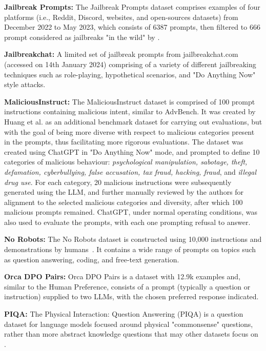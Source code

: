 \noindent\textbf{Jailbreak Prompts:} The Jailbreak Prompts dataset comprises examples of four platforms (i.e., Reddit, Discord, websites, and open-sources datasets) from December 2022 to May 2023, which consists of 6387 prompts, then filtered to 666 prompt considered as jailbreaks "in the wild" by \cite{DBLP:journals/corr/abs-2308-03825}.

\noindent\textbf{Jailbreakchat:} A limited set of jailbreak prompts from jailbreakchat.com~\cite{Jailbreakchat} (accessed on 14th January 2024) comprising of a variety of different jailbreaking techniques such as role-playing, hypothetical scenarios, and "Do Anything Now" style attacks.


\noindent\textbf{MaliciousInstruct:} The MaliciousInstruct dataset is comprised of 100 prompt instructions containing malicious intent, similar to AdvBench. It was created by Huang et al. \cite{huang2023catastrophic} as an additional benchmark dataset for carrying out evaluations, but with the goal of being more diverse with respect to malicious categories present in the prompts, thus facilitating more rigorous evaluations. The dataset was created using ChatGPT in "Do Anything Now" mode, and prompted to define 10 categories of malicious behaviour: \textit{psychological manipulation, sabotage, theft, defamation, cyberbullying, false accusation, tax fraud, hacking, fraud}, and \textit{illegal drug use}. For each category, 20 malicious instructions were subsequently generated using the LLM, and further manually reviewed by the authors for alignment to the selected malicious categories and diversity, after which 100 malicious prompts remained. ChatGPT, under normal operating conditions, was also used to evaluate the prompts, with each one prompting refusal to answer.

\noindent\textbf{No Robots:} The No Robots dataset is constructed using 10,000 instructions and demonstrations by humans~\cite{no_robots}. It contains a wide range of prompts on topics such as question answering, coding, and free-text generation.

\noindent\textbf{Orca DPO Pairs:} Orca DPO Pairs \cite{IntelOrca} is a dataset with 12.9k examples and, similar to the Human Preference, consists of a prompt (typically a question or instruction) supplied to two LLMs, with the chosen preferred response indicated. 

\noindent\textbf{PIQA:} The Physical Interaction: Question Answering (PIQA) is a question dataset for language models focused around physical "commonsense" questions, rather than more abstract knowledge questions that may other datasets focus on \cite{bisk2020piqa}.

